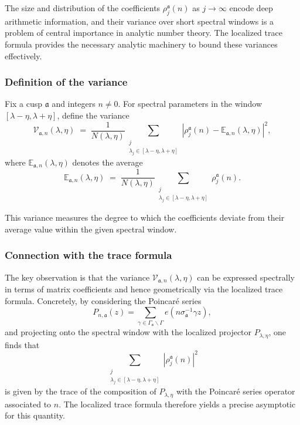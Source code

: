The size and distribution of the coefficients $\rho_j^\mathfrak{a}(n)$ as $j \to \infty$ encode deep arithmetic information, and their variance over short spectral windows is a problem of central importance in analytic number theory. The localized trace formula provides the necessary analytic machinery to bound these variances effectively.

\subsubsection{Definition of the variance}

Fix a cusp $\mathfrak{a}$ and integers $n \neq 0$. For spectral parameters in the window $[\lambda-\eta,\lambda+\eta]$, define the variance
\[
\mathcal{V}_{\mathfrak{a},n}(\lambda,\eta) \;=\; 
\frac{1}{N(\lambda,\eta)} \sum_{\substack{j \\ \lambda_j \in [\lambda-\eta,\lambda+\eta]}}
\left| \rho_j^\mathfrak{a}(n) - \mathbb{E}_{\mathfrak{a},n}(\lambda,\eta) \right|^2,
\]
where $\mathbb{E}_{\mathfrak{a},n}(\lambda,\eta)$ denotes the average
\[
\mathbb{E}_{\mathfrak{a},n}(\lambda,\eta) \;=\;
\frac{1}{N(\lambda,\eta)} \sum_{\substack{j \\ \lambda_j \in [\lambda-\eta,\lambda+\eta]}} \rho_j^\mathfrak{a}(n).
\]

This variance measures the degree to which the coefficients deviate from their average value within the given spectral window.

\subsubsection{Connection with the trace formula}

The key observation is that the variance $\mathcal{V}_{\mathfrak{a},n}(\lambda,\eta)$ can be expressed spectrally in terms of matrix coefficients and hence geometrically via the localized trace formula. Concretely, by considering the Poincaré series
\[
P_{n,\mathfrak{a}}(z) = \sum_{\gamma \in \Gamma_\mathfrak{a}\backslash\Gamma} e(n \sigma_\mathfrak{a}^{-1} \gamma z),
\]
and projecting onto the spectral window with the localized projector $P_{\lambda,\eta}$, one finds that
\[
\sum_{\substack{j \\ \lambda_j \in [\lambda-\eta,\lambda+\eta]}}
|\rho_j^\mathfrak{a}(n)|^2
\]
is given by the trace of the composition of $P_{\lambda,\eta}$ with the Poincaré series operator associated to $n$. The localized trace formula therefore yields a precise asymptotic for this quantity.

